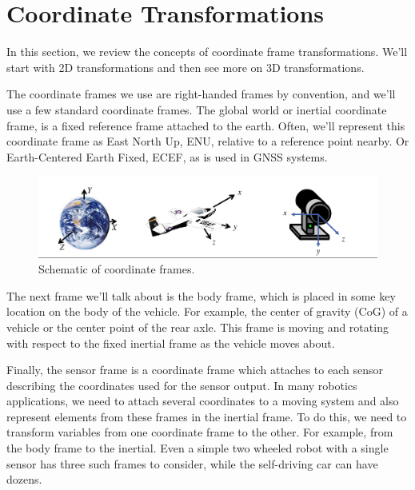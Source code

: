 \section{Coordinate Transformations}
\label{coordinate_transformations}

In this section, we review the concepts of coordinate frame transformations. 
We'll start with 2D transformations and then see more on 3D transformations. 

The coordinate frames we use are right-handed frames by convention, and we'll use a few standard coordinate frames.
The global world or inertial coordinate frame, is a fixed reference frame attached to the earth. Often, we'll represent this coordinate frame as East North Up, ENU, relative to a reference point nearby. Or Earth-Centered Earth Fixed, ECEF, as is used in GNSS systems.

\begin{figure}[!htb]
\begin{center}
\includegraphics[scale=0.290]{img/coordinate_transforms/coordinate_framew.jpeg}
\end{center}
\caption{Schematic of coordinate frames.}
\label{coordinate_framew}
\end{figure}


The next frame we'll talk about is the body frame, which is placed in some key location on the body of the vehicle. For example, the center of gravity (CoG) of a vehicle or the center point of the rear axle. This frame is moving and rotating with respect to the fixed inertial frame as the vehicle moves about.

Finally, the sensor frame is a coordinate frame which attaches to each sensor describing the coordinates used for the sensor output. In many robotics applications, we need to attach several coordinates to a moving system and also represent elements from these frames in the inertial frame. To do this, we need to transform variables from one coordinate frame to the other. For example, from the body frame to the inertial. Even a simple two wheeled robot with a single sensor has three such frames to consider, while the self-driving car can have dozens.


